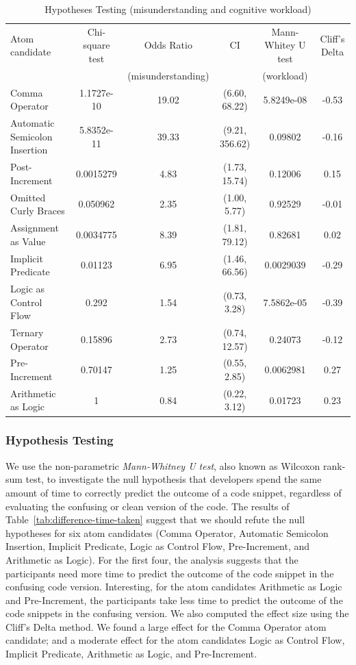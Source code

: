  \begin{table}[ht]
\caption{Hypotheses Testing (misunderstanding and cognitive workload)}
\label{tab:hypothesis-testing}

 \centering
 \begin{tabular}{lccc|cc}
   \toprule
Atom candidate & Chi-square test & Odds Ratio          & CI & Mann-Whitey U test & Cliff's Delta \\ 
     &         & (misunderstanding)  &                    & (workload)             & \\ \midrule
Comma Operator & 1.1727e-10 & 19.02 & (6.60, 68.22) & 5.8249e-08 & -0.53 \\ 
Automatic Semicolon Insertion & 5.8352e-11 & 39.33 & (9.21, 356.62) & 0.09802 & -0.16 \\ 
Post-Increment & 0.0015279 & 4.83 & (1.73, 15.74) & 0.12006 & 0.15 \\ 
Omitted Curly Braces & 0.050962 & 2.35 & (1.00, 5.77) & 0.92529 & -0.01 \\ 
Assignment as Value & 0.0034775 & 8.39 & (1.81, 79.12) & 0.82681 & 0.02 \\ 
Implicit Predicate & 0.01123 & 6.95 & (1.46, 66.56) & 0.0029039 & -0.29 \\ 
Logic as Control Flow & 0.292 & 1.54 & (0.73, 3.28) & 7.5862e-05 & -0.39 \\ 
Ternary Operator & 0.15896 & 2.73 & (0.74, 12.57) & 0.24073 & -0.12 \\ 
Pre-Increment & 0.70147 & 1.25 & (0.55, 2.85) & 0.0062981 & 0.27 \\ 
Arithmetic as Logic & 1 & 0.84 & (0.22, 3.12) & 0.01723 & 0.23 \\ 
    \bottomrule
 \end{tabular}
 \end{table}


\subsubsection*{Hypothesis Testing}
We use the non-parametric \emph{Mann-Whitney U test}, also known as Wilcoxon rank-sum test, to
investigate the null hypothesis that developers 
spend the same amount of time to correctly
predict the outcome of a code snippet, regardless
of evaluating the confusing or  clean version
of the code. The results of Table~\ref{tab:difference-time-taken}
suggest that we should refute the null hypotheses for
six atom candidates (Comma Operator, Automatic Semicolon Insertion,
Implicit Predicate, Logic
as Control Flow, Pre-Increment, and Arithmetic
as Logic). For the first four, the analysis suggests that the participants
need more time to predict the outcome of
the code snippet in the confusing code version. Interesting, for the atom candidates Arithmetic as Logic and Pre-Increment, the participants take less time
to predict the outcome of the code snippets in
the confusing version.
We also computed the effect size using the Cliff's Delta method. We found a large effect for the Comma Operator atom candidate; and a moderate effect for the atom candidates
Logic as Control Flow, Implicit Predicate, Arithmetic
as Logic, and Pre-Increment. 


